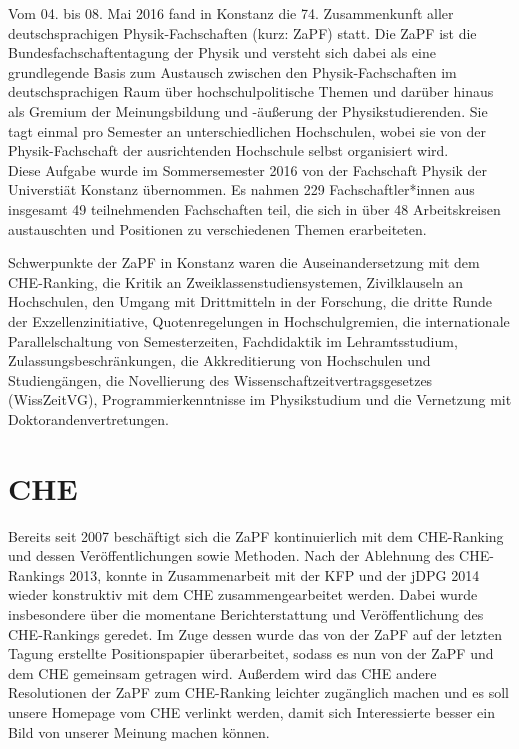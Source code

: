 Vom 04. bis 08. Mai 2016 fand in Konstanz die 74. Zusammenkunft
aller deutschsprachigen Physik-Fachschaften (kurz: ZaPF) statt.  Die ZaPF ist
die Bundesfachschaftentagung der Physik und versteht sich dabei als eine
grundlegende Basis zum Austausch zwischen den Physik-Fachschaften im
deutschsprachigen Raum über hochschulpolitische Themen und darüber hinaus als
Gremium der Meinungsbildung und -äußerung der Physikstudierenden. Sie tagt
einmal pro Semester an unterschiedlichen Hochschulen, wobei sie von der
Physik-Fachschaft der ausrichtenden Hochschule selbst organisiert wird. \\

Diese Aufgabe wurde im Sommersemester 2016 von der Fachschaft Physik der Universtiät Konstanz übernommen. 
Es nahmen 229 Fachschaftler*innen aus insgesamt 49 teilnehmenden Fachschaften teil, 
die sich in über  48 Arbeitskreisen austauschten und Positionen zu verschiedenen Themen erarbeiteten.

Schwerpunkte der ZaPF in Konstanz waren die Auseinandersetzung mit dem CHE-Ranking, 
die Kritik an Zweiklassenstudiensystemen, Zivilklauseln an Hochschulen, den Umgang mit 
Drittmitteln in der Forschung, die dritte Runde der Exzellenzinitiative, Quotenregelungen in Hochschulgremien, 
die internationale Parallelschaltung von Semesterzeiten, Fachdidaktik im Lehramtsstudium, 
Zulassungsbeschränkungen, die Akkreditierung von Hochschulen und Studiengängen, die Novellierung des Wissenschaftzeitvertragsgesetzes
(WissZeitVG), Programmierkenntnisse im Physikstudium und die Vernetzung mit Doktorandenvertretungen.

\newpage

\section*{CHE}  
Bereits seit 2007 beschäftigt sich die ZaPF kontinuierlich mit dem CHE-Ranking und dessen
Veröffentlichungen sowie Methoden. Nach der Ablehnung des CHE-Rankings 2013, konnte
in Zusammenarbeit mit der KFP und der jDPG 2014 wieder konstruktiv mit dem CHE
zusammengearbeitet werden. Dabei wurde insbesondere über die momentane Berichterstattung und 
Veröffentlichung des CHE-Rankings geredet. Im Zuge dessen wurde das von der ZaPF 
auf der letzten Tagung erstellte Positionspapier überarbeitet, sodass es nun von der 
ZaPF und dem CHE gemeinsam getragen wird. Außerdem wird das CHE andere Resolutionen 
der ZaPF zum CHE-Ranking leichter zugänglich machen und es soll unsere Homepage vom CHE 
verlinkt werden, damit sich Interessierte besser ein Bild von unserer Meinung machen können.


